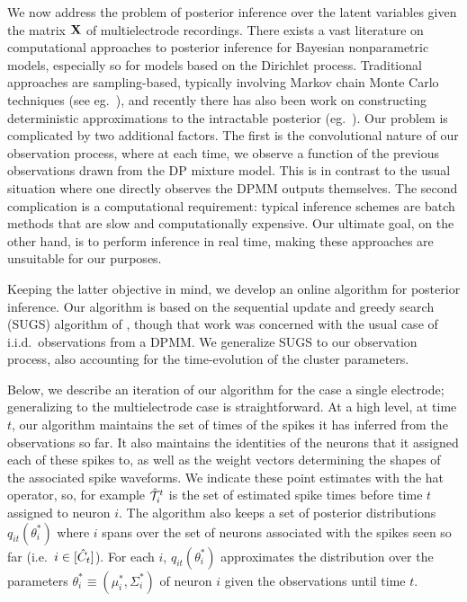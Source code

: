 \newcommand{\tx}{\tilde{x}}
\newcommand{\resx}{\delta{\bx}^L}


We now address the problem of posterior inference over the latent variables given the matrix $\mathbf{X}$ of multielectrode recordings. 
There exists a vast literature on computational approaches to posterior inference for Bayesian nonparametric models, especially so for models based on the 
Dirichlet process.
Traditional approaches are sampling-based, typically involving Markov chain Monte Carlo techniques (see eg.\ \citep{Nea2000, IshJam2001}), 
and recently there has also been work on constructing deterministic approximations to the intractable posterior (eg.\ \citep{BleJor2006, MinGha2003}).
Our problem is complicated by two additional factors. The first is the convolutional nature of our observation process, 
where at each time,
we observe a function of the previous observations drawn from the DP mixture model. This is in contrast to the usual situation where one directly observes 
the DPMM outputs themselves.
The second complication is a computational requirement: typical inference schemes are batch methods that are slow and computationally expensive. 
Our ultimate goal, on the other hand, is to perform inference in real time, making these approaches are unsuitable for our purposes.

Keeping the latter objective in mind, we develop an online algorithm for posterior inference. Our algorithm is based on the sequential update and
greedy search (SUGS) algorithm of
\citep{WangDun2009}, though that work was concerned with the usual case of i.i.d.\ observations from a DPMM. We generalize SUGS to our 
observation process, also accounting for the time-evolution of the cluster parameters.

Below, we describe an iteration of our algorithm for the case a single electrode; %
generalizing to the multielectrode case is straightforward. 
At a high level, at time $t$, our algorithm maintains the set of times of the spikes it has inferred from the observations so far. It also maintains
the identities of the neurons that it assigned each of these spikes to, as well as the weight vectors determining the shapes of the associated spike 
waveforms. We indicate these point estimates with the hat operator, so, for example $\hat{\mathcal{T}}^t_i$ is the set of estimated spike times before time $t$ assigned
to neuron $i$. The algorithm also keeps a set of posterior distributions $q_{it}(\theta^*_i)$ where $i$ spans over the
set of neurons associated with the spikes seen so far (i.e.\ $i \in [\hat{C}_t]$). 
For each $i$, $q_{it}(\theta^*_i)$ approximates the distribution over the parameters 
$\theta_i^* \equiv (\mu_i^*, \Sigma_i^*)$ of neuron $i$ given the observations until time $t$. 

